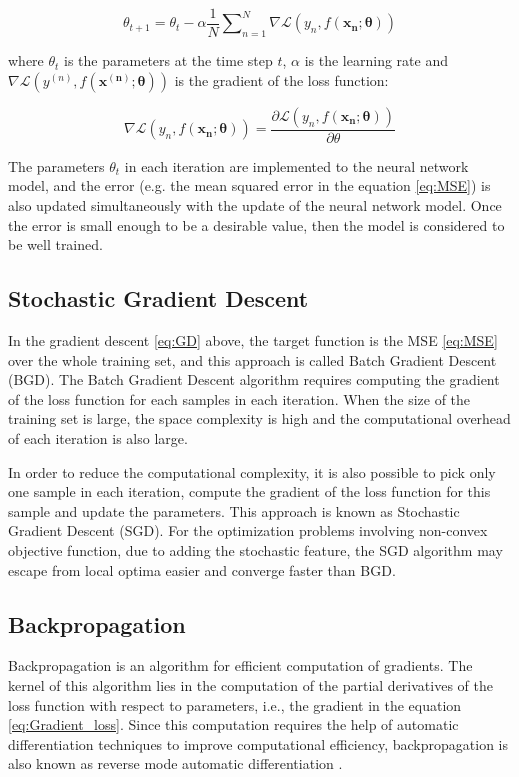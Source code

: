 \documentclass[
	parskip, 			   %
	twoside, 			   %
	DIV=14, 			   %
	BCOR=15.0mm, 		   %
	headsepline, 		   %
	open=right, 		   %
	captions=tableheading, %
	bibliography=totoc,    %
	numbers=noenddot       %
]{scrreprt}
\begin{document}
\begin{equation}
    \label{eq:GD}
    \theta_{t+1} = \theta_{t} - \alpha \frac{1}{N} \sum\nolimits_{n=1}^N \nabla \mathcal{L}\left( y_{n},f(\mathbf{x_{n}};\mathbf{\theta}) \right)
\end{equation}

where $\theta_{t}$ is the parameters at the time step $t$, $\alpha$ is the learning rate and $\nabla \mathcal{L}\left( y^{(n)},f(\mathbf{x^{(n)}};\mathbf{\theta}) \right)$ is the gradient of the loss function:

\begin{equation}
    \label{eq:Gradient_loss}
    \nabla \mathcal{L}\left( y_{n},f(\mathbf{x_{n}};\mathbf{\theta}) \right) = \frac{\partial \mathcal{L}\left( y_{n},f(\mathbf{x_{n}};\mathbf{\theta}) \right)}{\partial \theta}
\end{equation}

The parameters $\theta_{t}$ in each iteration are implemented to the neural network model, and the error (e.g. the mean squared error in the equation \ref{eq:MSE}) is also updated simultaneously with the update of the neural network model. Once the error is small enough to be a desirable value, then the model is considered to be well trained.

\subsection{Stochastic Gradient Descent}
In the gradient descent \ref{eq:GD} above, the target function is the MSE \ref{eq:MSE} over the whole training set, and this approach is called Batch Gradient Descent (BGD).  The Batch Gradient Descent algorithm requires computing the gradient of the loss function for each samples in each iteration. When the size of the training set is large, the space complexity is high and the computational overhead of each iteration is also large.

In order to reduce the computational complexity, it is also possible to pick only one sample in each iteration, compute the gradient of the loss function for this sample and update the parameters. This approach is known as Stochastic Gradient Descent (SGD). For the optimization problems involving non-convex objective function, due to adding the stochastic feature, the SGD algorithm may escape from local optima easier and converge faster than BGD.

\subsection{Backpropagation}
Backpropagation is an algorithm for efficient computation of gradients. The kernel of this algorithm lies in the computation of the partial derivatives of the loss function with respect to parameters, i.e., the gradient in the equation \ref{eq:Gradient_loss}. Since this computation requires the help of automatic differentiation techniques to improve computational efficiency, backpropagation is also known as reverse mode automatic differentiation \cite{baydin2018automatic}.
\end{document}
